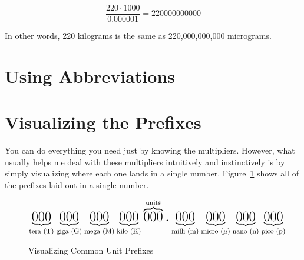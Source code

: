 $$\frac{220 \cdot 1000}{0.000001} = 220000000000$$

In other words, 220 kilograms is the same as 220,000,000,000 micrograms.

\section{Using Abbreviations}

\section{Visualizing the Prefixes}

You can do everything you need just by knowing the multipliers.
However, what usually helps me deal with these multipliers intuitively and instinctively is by simply visualizing where each one lands in a single number.
Figure~\ref{figSIUnitVisualization} shows all of the prefixes laid out in a single number.

\begin{figure}
\caption{Visualizing Common Unit Prefixes}
\label{figSIUnitVisualization}
\centering
$$\mathlarger{\mathlarger{\mathlarger{\underbrace{000}_\text{\smaller[2]{tera (T)}}\underbrace{000}_\text{\smaller[2]{giga (G)}}\underbrace{000}_\text{\smaller[2]{mega (M)}}\underbrace{000}_\text{\smaller[2]{kilo (K)}}\overbrace{000}^\text{\smaller[2]{units}}.\underbrace{000}_\text{\smaller[2]{milli (m)}}\underbrace{000}_\text{\smaller[2]{micro ($\mu$)}}\underbrace{000}_\text{\smaller[2]{nano (n)}}\underbrace{000}_\text{\smaller[2]{pico (p)}}}}}$$
\end{figure}

\applysection


